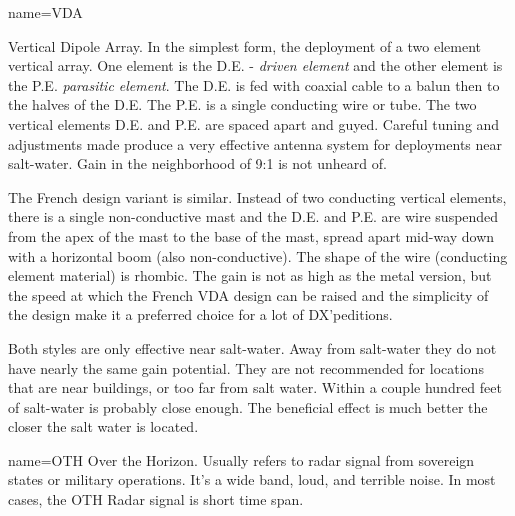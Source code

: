  { name={{VDA}} }
{
Vertical Dipole Array.  In the simplest form, the deployment of
a two element vertical array.  One element is the D.E. - {\textit{driven element}}
and the other element is the P.E. {\textit{parasitic element}}.
The  D.E. is fed with coaxial cable to a balun then to the halves of the
D.E.  The P.E. is a single conducting wire or tube.  The two vertical
elements D.E. and P.E. are spaced apart and guyed.   Careful tuning
and adjustments made produce a very effective antenna system for 
deployments near salt-water.  Gain in the neighborhood of 9:1 is not
unheard of.  
\par
The French design variant is similar.  Instead of two conducting vertical
elements, there is a single non-conductive mast and the D.E. and P.E. are wire suspended from the apex of the mast to the base of the mast, spread apart mid-way down with a horizontal boom (also non-conductive).  The shape of the wire
(conducting element material) is rhombic.    The gain is not as high
as the metal version, but the speed at which the French VDA design can be
raised and the simplicity of the design make it a preferred choice for
a lot of DX'peditions.
\par
Both styles are only effective near salt-water.  Away from salt-water
they do not have nearly the same gain potential.  They are not 
recommended for locations that are near buildings, or too far from salt
water.  Within a couple hundred feet of salt-water is probably close enough.
The beneficial effect is much better the closer the salt water is located.
}


 { name={{OTH}} }
{
Over the Horizon.  Usually refers to radar signal from
sovereign states or military operations.  It's a wide band, loud,
and terrible noise.  In most cases, the OTH Radar signal is short time span.
}
